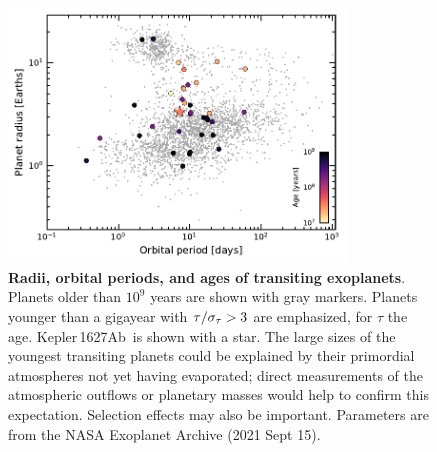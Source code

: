 \documentclass[12pt,modern,twocolumn,tighten]{aastex63}
\newcommand{\pn}{Kepler\,1627Ab} %
\begin{document}
\begin{figure}[tp]
	\begin{center}
		\leavevmode
		\includegraphics[width=0.8\textwidth]{f14.pdf}
	\end{center}
	\vspace{-0.7cm}
	\caption{
		{\bf Radii, orbital periods, and ages of transiting
			exoplanets}.  Planets older than $10^9$ years are shown with gray
		markers.  Planets younger than a gigayear with ${\rm
			\tau}/\sigma_{\rm \tau} > 3$ are emphasized, for $\tau$ the age.
		\pn\ is shown with a
		star.  The large sizes of the youngest transiting planets could be
		explained by their primordial atmospheres not yet having
		evaporated; direct measurements of the atmospheric outflows or
		planetary masses would help to confirm this expectation.
		Selection effects may also be important.  Parameters are from the
		NASA Exoplanet Archive (2021 Sept 15).
		\label{fig:rp_period_age}
	}
\end{figure}


\end{document}
